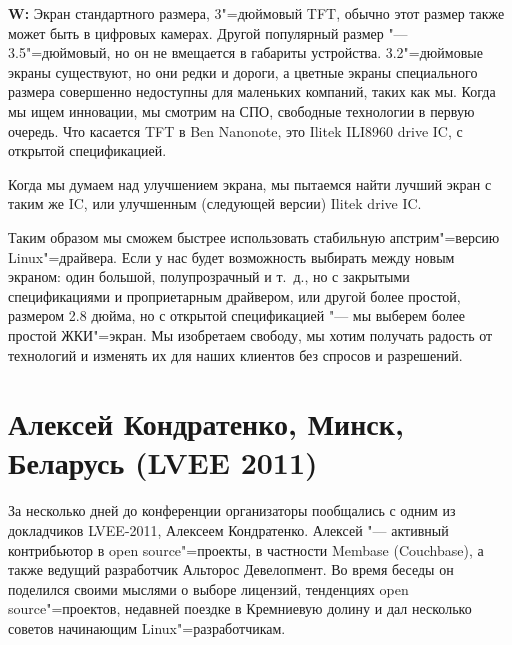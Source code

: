 \documentclass[10pt, a5paper]{article}
\begin{document}
{\noindent \bf W:} Экран стандартного размера, 3"=дюймовый TFT, обычно этот размер также может быть в цифровых камерах. Другой популярный размер "--- 3.5"=дюймовый, но он не вмещается в габариты устройства. 3.2"=дюймовые экраны существуют, но они редки и дороги, а цветные экраны специального размера совершенно недоступны для маленьких компаний, таких как мы. Когда мы ищем инновации, мы смотрим на СПО, свободные технологии в первую очередь. Что касается TFT в Ben Nanonote, это Ilitek ILI8960 drive IC, с открытой спецификацией.

Когда мы думаем над улучшением экрана, мы пытаемся найти лучший экран с таким же IC, или улучшенным (следующей версии) Ilitek drive IC.

Таким образом мы сможем быстрее использовать стабильную апстрим"=версию Linux"=драйвера. Если у нас будет возможность выбирать между новым экраном: один большой, полупрозрачный и т.~д., но с закрытыми спецификациями и проприетарным драйвером, или другой более простой, размером 2.8 дюйма, но с открытой спецификацией "--- мы выберем более простой ЖКИ"=экран. Мы изобретаем свободу, мы хотим получать радость от технологий и изменять их для наших клиентов без спросов и разрешений.

\section{Алексей Кондратенко, Минск, Беларусь (LVEE 2011)}

\begin{figure}[ht]
\end{figure}

За несколько дней до конференции организаторы пообщались с одним из докладчиков LVEE-2011, Алексеем Кондратенко. Алексей "--- активный контрибьютор в open source"=проекты, в частности Membase (Couchbase), а также ведущий разработчик Альторос Девелопмент. Во время беседы он поделился своими мыслями о выборе лицензий, тенденциях open source"=проектов, недавней поездке в Кремниевую долину и дал несколько советов начинающим Linux"=разработчикам.
\end{document}
